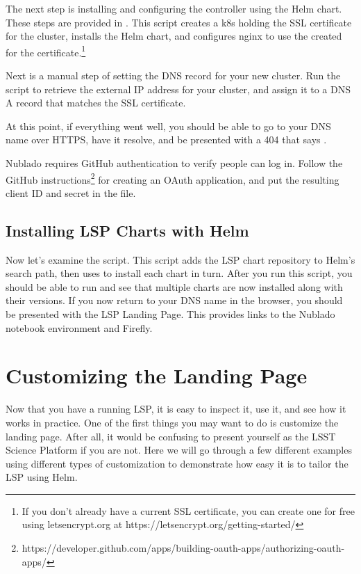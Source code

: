 \documentclass[11pt,twoside]{article}
\begin{document}
The next step is installing and configuring the  controller
using the Helm chart.  These steps are provided in .
This script creates a k8s  holding the SSL certificate for the cluster, installs the Helm
chart, and configures nginx to use the created  for the certificate.\footnote{
If you don't already have a current SSL certificate, you can create one for
free using letsencrypt.org at https://letsencrypt.org/getting-started/}

Next is a manual step of setting the DNS record for your new cluster.
Run the  script to retrieve the external IP address for your
cluster, and assign it to a DNS A record that matches the SSL certificate.

At this point, if everything went well, you should be able to go to your
DNS name over HTTPS, have it resolve, and be presented with a 404 that says
.

Nublado requires GitHub authentication to verify people can log in.  Follow
the GitHub instructions\footnote{
https://developer.github.com/apps/building-oauth-apps/authorizing-oauth-apps/
} for creating an OAuth application, and put the resulting client ID and secret in the
 file.

\subsection{Installing LSP Charts with Helm}

Now let's examine the  script.  This script adds the LSP
chart repository to Helm's search path, then uses  to install
each chart in turn.  After you run this script, you should be able to run 
and see that multiple charts are now installed along with their versions.  If you
now return to your DNS name in the browser, you should be presented with the
LSP Landing Page.  This provides links to the Nublado notebook environment and
Firefly.

\section{Customizing the Landing Page}

Now that you have a running LSP, it is easy to inspect it, use it, and see
how it works in practice.  One of the first things you may want to do is
customize the landing page.  After all, it would be confusing to present
yourself as the LSST Science Platform if you are not.  Here we will go
through a few different examples using different types of customization
to demonstrate how easy it is to tailor the LSP using Helm.
\end{document}

